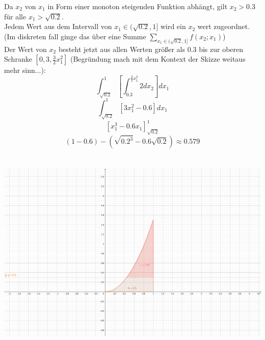 \documentclass{article}
\begin{document}
	Da $x_2$ von $x_1$ in Form einer monoton steigenden Funktion abhängt, gilt $x_2>0.3$ für alle $x_1>\sqrt{0.2}$.\\
	Jedem Wert aus dem Intervall von $x_1\in (\sqrt{0.2}, 1]$ wird ein $x_2$ wert zugeordnet. (Im diskreten fall ginge das über eine Summe $\sum_{x_1\in(\sqrt{0.2},1]} f(x_2;x_1)$)\\
	Der Wert von $x_2$ besteht jetzt aus allen Werten größer als 0.3 bis zur oberen Schranke $[0,3,\frac{3}{2}x_1^2]$ (Begründung mach mit dem Kontext der Skizze weitaus mehr sinn...):\\
	\[\int_{\sqrt{0.2}}^1\left[\int_{0.3}^{\frac{3}{2}x_1^2} 2 dx_2\right]dx_1\]
	\[\int_{\sqrt{0.2}}^1\left[3x_1^2-0.6\right]dx_1\]
	\[\left[x_1^3-0.6x_1\right]_{\sqrt{0.2}}^1\]
	\[(1-0.6)-(\sqrt{0.2^3}-0.6\sqrt{0.2}) \approx 0.579\]
	
	\includegraphics[height=10cm]{TrägermengeUndEreignis.png}\\
\end{document}
